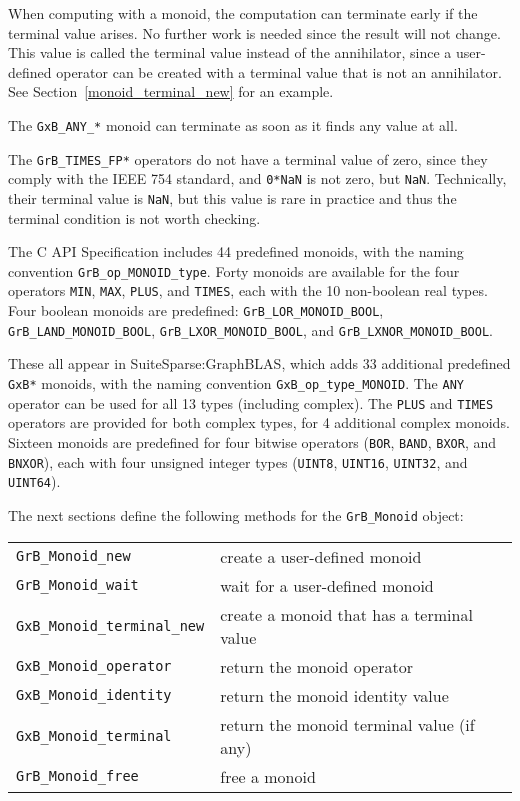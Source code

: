 \documentclass[12pt]{article}
\begin{document}
When computing with a monoid, the computation can terminate early if the
terminal value arises.  No further work is needed since the result will not
change.  This value is called the terminal value instead of the annihilator,
since a user-defined operator can be created with a terminal value that is not
an annihilator.  See Section~\ref{monoid_terminal_new} for an example.

The \verb'GxB_ANY_*' monoid can terminate as soon as it finds any value at all.

The \verb'GrB_TIMES_FP*' operators do not have a terminal value of zero, since
they comply with the IEEE 754 standard, and \verb'0*NaN' is not zero, but
\verb'NaN'.  Technically, their terminal value is \verb'NaN', but this value is
rare in practice and thus the terminal condition is not worth checking.

The C API Specification includes 44 predefined monoids, with the naming
convention \verb'GrB_op_MONOID_type'.  Forty monoids are available for the four
operators \verb'MIN', \verb'MAX', \verb'PLUS', and \verb'TIMES', each with the
10 non-boolean real types.  Four boolean monoids are predefined:
\verb'GrB_LOR_MONOID_BOOL', \verb'GrB_LAND_MONOID_BOOL',
\verb'GrB_LXOR_MONOID_BOOL', and \verb'GrB_LXNOR_MONOID_BOOL'.

These all appear in SuiteSparse:GraphBLAS, which adds 33 additional predefined
\verb'GxB*' monoids, with the naming convention \verb'GxB_op_type_MONOID'.  The
\verb'ANY' operator can be used for all 13 types (including complex).  The
\verb'PLUS' and \verb'TIMES' operators are provided for both complex types, for
4 additional complex monoids.  Sixteen monoids are predefined for four bitwise
operators (\verb'BOR', \verb'BAND', \verb'BXOR', and \verb'BNXOR'), each with
four unsigned integer types (\verb'UINT8', \verb'UINT16', \verb'UINT32', and
\verb'UINT64').

The next sections define the following methods for the \verb'GrB_Monoid'
object:

\vspace{0.2in}
{\footnotesize
\begin{tabular}{ll}
\hline
\verb'GrB_Monoid_new'       & create a user-defined monoid \\
\verb'GrB_Monoid_wait'      & wait for a user-defined monoid \\
\verb'GxB_Monoid_terminal_new'  & create a monoid that has a terminal value\\
\verb'GxB_Monoid_operator'  & return the monoid operator \\
\verb'GxB_Monoid_identity'  & return the monoid identity value \\
\verb'GxB_Monoid_terminal'  & return the monoid terminal value (if any) \\
\verb'GrB_Monoid_free'      & free a monoid \\
\hline
\end{tabular}
}
\vspace{0.2in}
\end{document}
